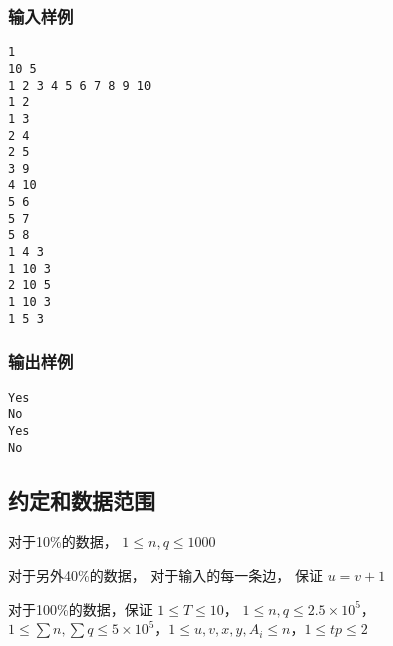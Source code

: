 \documentclass[UTF8]{ctexart}
\begin{document}
\subsubsection{输入样例}

\begin{lstlisting}
1
10 5
1 2 3 4 5 6 7 8 9 10
1 2
1 3
2 4
2 5
3 9
4 10
5 6
5 7
5 8
1 4 3
1 10 3
2 10 5
1 10 3
1 5 3
\end{lstlisting}

\subsubsection{输出样例}

\begin{lstlisting}
Yes
No
Yes
No
\end{lstlisting}

\subsection{约定和数据范围}

对于10\%的数据， $1\le n,q\le 1000$

对于另外40\%的数据， 对于输入的每一条边， 保证 $u=v+1$

对于100\%的数据，保证 $1\le T\le 10$， $1\le n,q\le 2.5\times 10^5$， $1\le \sum n,\sum q\le 5\times 10^5$，$1\le u,v,x,y,A_i \le n$，$1\le tp\le 2$
\end{document}
